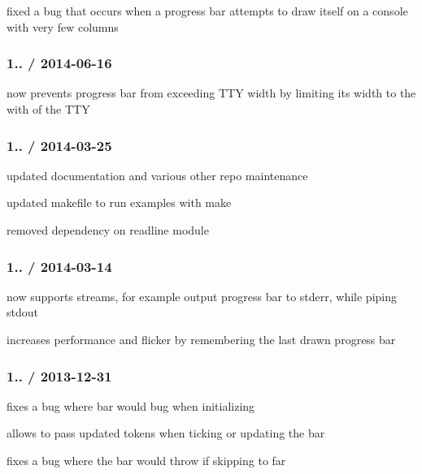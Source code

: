 
\begin{DoxyItemize}
\item fixed a bug that occurs when a progress bar attempts to draw itself on a console with very few columns
\end{DoxyItemize}

\subsubsection*{1.. / 2014-\/06-\/16}


\begin{DoxyItemize}
\item now prevents progress bar from exceeding T\+TY width by limiting its width to the with of the T\+TY
\end{DoxyItemize}

\subsubsection*{1.. / 2014-\/03-\/25}


\begin{DoxyItemize}
\item updated documentation and various other repo maintenance
\item updated makefile to run examples with {\ttfamily make}
\item removed dependency on readline module
\end{DoxyItemize}

\subsubsection*{1.. / 2014-\/03-\/14}


\begin{DoxyItemize}
\item now supports streams, for example output progress bar to stderr, while piping stdout
\item increases performance and flicker by remembering the last drawn progress bar
\end{DoxyItemize}

\subsubsection*{1.. / 2013-\/12-\/31}


\begin{DoxyItemize}
\item fixes a bug where bar would bug when initializing
\item allows to pass updated tokens when ticking or updating the bar
\item fixes a bug where the bar would throw if skipping to far
\end{DoxyItemize}

